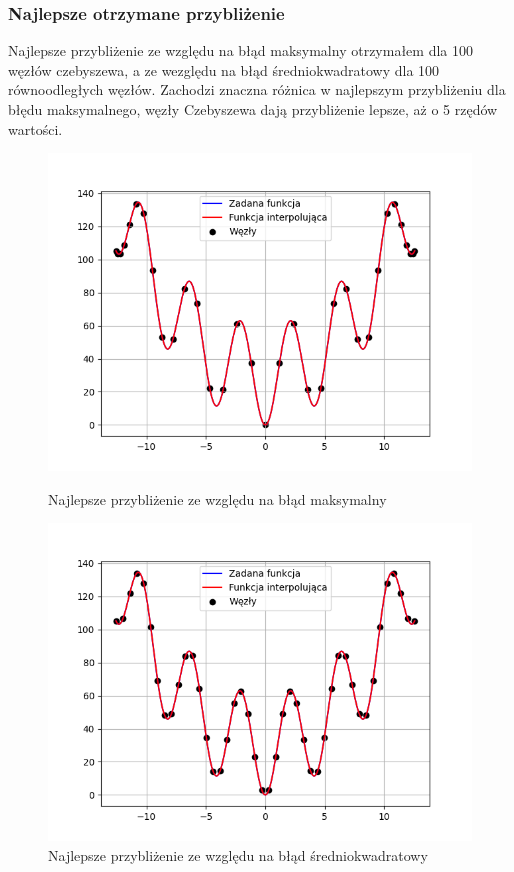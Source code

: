 \documentclass{article}
\begin{document}
\subsubsection{Najlepsze otrzymane przybliżenie}

Najlepsze przybliżenie ze względu na błąd maksymalny otrzymałem dla 100 węzłów czebyszewa, a ze wezględu na błąd średniokwadratowy dla 100 równoodległych węzłów. Zachodzi znaczna różnica w najlepszym przybliżeniu dla błędu maksymalnego, węzły Czebyszewa dają przybliżenie lepsze, aż o 5 rzędów wartości.

\begin{figure}[H]
  \begin{minipage}[b]{0.49\textwidth}
    \includegraphics[width=\textwidth]{img12.png}
    \caption{Najlepsze przybliżenie ze względu na błąd maksymalny}
  \end{minipage}
  \hfill
  \begin{minipage}[b]{0.49\textwidth}
    \includegraphics[width=\textwidth]{img11.png}
    \caption{Najlepsze przybliżenie ze względu na błąd średniokwadratowy}
  \end{minipage}
\end{figure}
\end{document}
